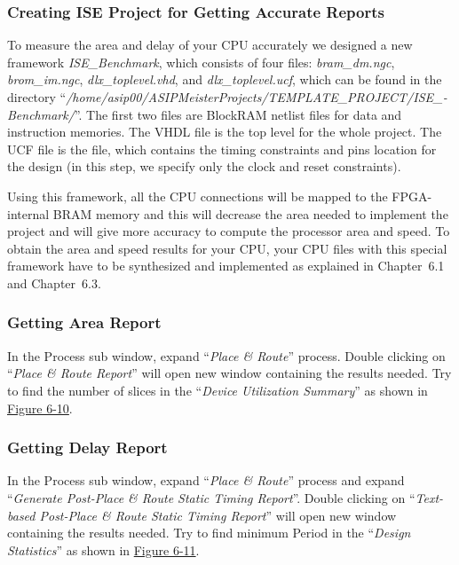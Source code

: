 \documentclass[
]{article}
\begin{document}
\hypertarget{creating-ise-project-for-getting-accurate-reports}{%
\subsubsection{Creating ISE Project for Getting Accurate
Reports}\label{creating-ise-project-for-getting-accurate-reports}}

To measure the area and delay of your CPU accurately we designed a new
framework \emph{ISE\_Benchmark}, which consists of four files:
\emph{bram\_dm.ngc}, \emph{brom\_im.ngc}, \emph{dlx\_toplevel.vhd}, and
\emph{dlx\_toplevel.ucf}, which can be found in the directory
``\emph{/home/asip00/­ASIPMeisterProjects/­TEMPLATE\_PROJECT/­ISE\_­Benchmark/}''.
The first two files are BlockRAM netlist files for data and instruction
memories. The VHDL file is the top level for the whole project. The UCF
file is the file, which contains the timing constraints and pins
location for the design (in this step, we specify only the clock and
reset constraints).

Using this framework, all the CPU connections will be mapped to the
FPGA-internal BRAM memory and this will decrease the area needed to
implement the project and will give more accuracy to compute the
processor area and speed. To obtain the area and speed results for your
CPU, your CPU files with this special framework have to be synthesized
and implemented as explained in Chapter~6.1 and Chapter~6.3.

\hypertarget{getting-area-report}{%
\subsubsection{Getting Area Report}\label{getting-area-report}}

In the Process sub window, expand ``\emph{Place \& Route}'' process.
Double clicking on ``\emph{Place \& Route Report}'' will open new window
containing the results needed. Try to find the number of slices in the
``\emph{Device Utilization Summary}'' as shown in
\protect\hyperlink{Fig610}{Figure 6-10}.

\hypertarget{getting-delay-report}{%
\subsubsection{Getting Delay Report}\label{getting-delay-report}}

In the Process sub window, expand ``\emph{Place \& Route}'' process and
expand ``\emph{Generate Post-Place \& Route Static Timing Report}''.
Double clicking on ``\emph{Text-based Post-Place \& Route Static Timing
Report}'' will open new window containing the results needed. Try to
find minimum Period in the ``\emph{Design Statistics}'' as shown in
\protect\hyperlink{Fig611}{Figure 6-11}.
\end{document}
